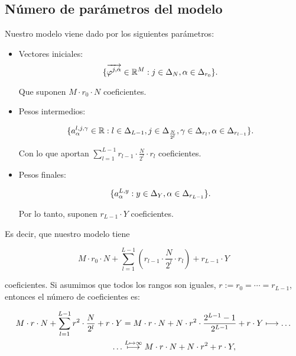 \subsection{Número de parámetros del modelo} \label{msubs:parametros_modelo_ht}

Nuestro modelo viene dado por los siguientes parámetros:

\begin{itemize}
	\item Vectores iniciales:
	      \begin{equation}
		      \{\overrightarrow{\varphi^{j, \alpha}} \in \mathbb{R}^M: j \in \Delta_{N}, \alpha \in \Delta_{r_0}  \}.
	      \end{equation}

	      Que suponen $M \cdot r_0 \cdot N$ coeficientes.
	\item Pesos intermedios:

	      \begin{equation}
		      \{ a^{l, j, \gamma}_{\alpha} \in \mathbb{R}: l \in \Delta_{L-1}, j \in \Delta_{\frac{N}{2^l}}, \gamma \in \Delta_{r_l}, \alpha \in \Delta_{r_{l-1}} \}.
	      \end{equation}

	      Con lo que aportan $\sum_{l = 1}^{L-1} r_{l-1} \cdot \frac{N}{2^l} \cdot r_l$ coeficientes.

	\item Pesos finales:

	      \begin{equation}
		      \{a^{L, y}_{\alpha}: y \in \Delta_{Y}, \alpha \in \Delta_{r_{L-1}} \}.
	      \end{equation}

	      Por lo tanto, suponen $r_{L-1} \cdot Y$ coeficientes.
\end{itemize}

Es decir, que nuestro modelo tiene

\begin{equation}
	M \cdot r_0 \cdot N + \sum_{l = 1}^{L-1} (r_{l-1} \cdot \frac{N}{2^l} \cdot r_l ) +
	r_{L-1} \cdot Y
\end{equation}

coeficientes. Si asumimos que todos los rangos son iguales, $r := r_0 = \cdots = r_{L-1}$, entonces el número de coeficientes es:

\begin{equation}
	\begin{split}
		M \cdot r \cdot N + \sum_{l = 1}^{L-1} r^2 \cdot \frac{N}{2^l} + r \cdot Y &= M \cdot r \cdot N + N \cdot r^2 \cdot \frac{2^{L-1} - 1}{2^{L-1}} + r \cdot Y \longmapsto \ldots \\
		\ldots & \stackrel{L \mapsto \infty}{\longmapsto} M \cdot r \cdot N + N \cdot r^2 + r \cdot Y,
	\end{split}
\end{equation}

